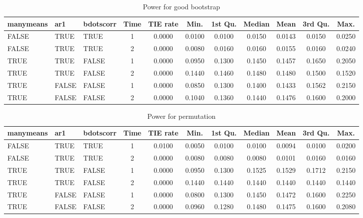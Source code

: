\documentclass{article}
\begin{document}
\begin{table}[H]
\centering
\begin{tabular}{lllcccccccc}
  \hline
manymeans & ar1 & bdotscorr & Time & TIE rate & Min. & 1st Qu. & Median & Mean & 3rd Qu. & Max. \\ 
  \hline
FALSE & TRUE & TRUE &     1 & 0.0000 & 0.0100 & 0.0100 & 0.0150 & 0.0143 & 0.0150 & 0.0250 \\ 
  FALSE & TRUE & TRUE &     2 & 0.0000 & 0.0080 & 0.0160 & 0.0160 & 0.0155 & 0.0160 & 0.0240 \\ 
  TRUE & TRUE & FALSE &     1 & 0.0000 & 0.0950 & 0.1300 & 0.1450 & 0.1457 & 0.1650 & 0.2050 \\ 
  TRUE & TRUE & FALSE &     2 & 0.0000 & 0.1440 & 0.1460 & 0.1480 & 0.1480 & 0.1500 & 0.1520 \\ 
  TRUE & FALSE & FALSE &     1 & 0.0000 & 0.0850 & 0.1300 & 0.1400 & 0.1433 & 0.1562 & 0.2150 \\ 
  TRUE & FALSE & FALSE &     2 & 0.0000 & 0.1040 & 0.1360 & 0.1440 & 0.1476 & 0.1600 & 0.2000 \\ 
   \hline
\end{tabular}
\caption{Power for good bootstrap} 
\label{tab:good_boot_pwr}
\end{table}

\begin{table}[H]
\centering
\begin{tabular}{lllcccccccc}
  \hline
manymeans & ar1 & bdotscorr & Time & TIE rate & Min. & 1st Qu. & Median & Mean & 3rd Qu. & Max. \\ 
  \hline
FALSE & TRUE & TRUE &     1 & 0.0100 & 0.0050 & 0.0100 & 0.0100 & 0.0094 & 0.0100 & 0.0200 \\ 
  FALSE & TRUE & TRUE &     2 & 0.0000 & 0.0080 & 0.0080 & 0.0080 & 0.0101 & 0.0160 & 0.0160 \\ 
  TRUE & TRUE & FALSE &     1 & 0.0000 & 0.0950 & 0.1300 & 0.1525 & 0.1529 & 0.1712 & 0.2150 \\ 
  TRUE & TRUE & FALSE &     2 & 0.0000 & 0.1440 & 0.1440 & 0.1440 & 0.1440 & 0.1440 & 0.1440 \\ 
  TRUE & FALSE & FALSE &     1 & 0.0000 & 0.0800 & 0.1300 & 0.1450 & 0.1472 & 0.1600 & 0.2250 \\ 
  TRUE & FALSE & FALSE &     2 & 0.0000 & 0.0960 & 0.1280 & 0.1480 & 0.1475 & 0.1600 & 0.2080 \\ 
   \hline
\end{tabular}
\caption{Power for permutation} 
\label{tab:perm_pwr}
\end{table}
\end{document}

